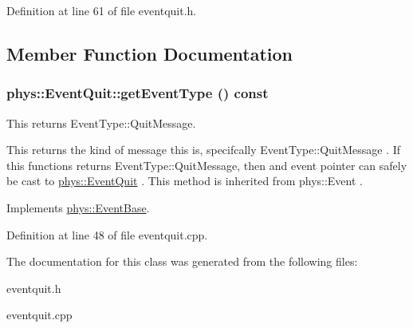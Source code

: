 Definition at line 61 of file eventquit.h.



\subsection{Member Function Documentation}
\hypertarget{classphys_1_1EventQuit_ad996640acbb58d2a17fc405de6515c93}{
\subsubsection[{getEventType}]{ phys::EventQuit::getEventType () const}}
\label{dd/dea/classphys_1_1EventQuit_ad996640acbb58d2a17fc405de6515c93}


This returns EventType::QuitMessage. 

This returns the kind of message this is, specifcally EventType::QuitMessage . If this functions returns EventType::QuitMessage, then and event pointer can safely be cast to \hyperlink{classphys_1_1EventQuit}{phys::EventQuit} . This method is inherited from phys::Event . 

Implements \hyperlink{classphys_1_1EventBase_a0f39a25f4b64f7cf701e174454616366}{phys::EventBase}.



Definition at line 48 of file eventquit.cpp.



The documentation for this class was generated from the following files:\begin{DoxyCompactItemize}
\item 
eventquit.h\item 
eventquit.cpp\end{DoxyCompactItemize}
